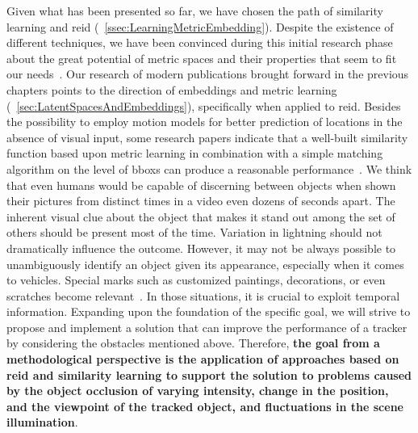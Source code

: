 Given what has been presented so far, we have chosen the path of similarity learning and \gls{reid} (\sectiontext{}~\ref{ssec:LearningMetricEmbedding}). Despite the existence of different techniques, we have been convinced during this initial research phase about the great potential of metric spaces and their properties that seem to fit our needs~\cite{liu2016ssd}. Our research of modern publications brought forward in the previous chapters points to the direction of embeddings and metric learning (\sectiontext{}~\ref{sec:LatentSpacesAndEmbeddings}), specifically when applied to \gls{reid}. Besides the possibility to employ motion models for better prediction of locations in the absence of visual input, some research papers indicate that a well-built similarity function based upon metric learning in combination with a simple matching algorithm on the level of \glspl{bbox} can produce a reasonable performance~\cite{tao2016sint}. We think that even humans would be capable of discerning between objects when shown their pictures from distinct times in a video even dozens of seconds apart. The inherent visual clue about the object that makes it stand out among the set of others should be present most of the time. Variation in lightning should not dramatically influence the outcome. However, it may not be always possible to unambiguously identify an object given its appearance, especially when it comes to vehicles. Special marks such as customized paintings, decorations, or even scratches become relevant~\cite{liu2016ssd}. In those situations, it is crucial to exploit temporal information. Expanding upon the foundation of the specific goal, we will strive to propose and implement a solution that can improve the performance of a tracker by considering the obstacles mentioned above. Therefore, \textbf{the goal from a methodological perspective is the application of approaches based on \gls{reid} and similarity learning to support the solution to problems caused by the object occlusion of varying intensity, change in the position, and the viewpoint of the tracked object, and fluctuations in the scene illumination}.

